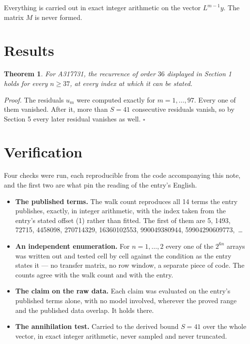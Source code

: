 \documentclass[11pt]{article}
\newtheorem{theorem}{Theorem}
\theoremstyle{definition}
\begin{document}
Everything is carried out in exact integer arithmetic on the vector $L^{m-1}y$. The matrix $M$ is never formed.

\section{Results}

\begin{theorem} For A317731, the recurrence of order $36$ displayed in Section 1 holds for every $n \ge 37$, at every index at which it can be stated.\end{theorem}

{\itshape Proof.} The residuals $u_m$ were computed exactly for $m = 1,\dots,97$. Every one of them vanished. After it, more than $S = 41$ consecutive residuals vanish, so by Section 5 every later residual vanishes as well. $\square$

\section{Verification}

Four checks were run, each reproducible from the code accompanying this note, and the first two are what pin the reading of the entry's English.

\begin{itemize}

\item {\bfseries The published terms.} The walk count reproduces all 14 terms the entry publishes, exactly, in integer arithmetic, with the index taken from the entry's stated offset (1) rather than fitted. The first of them are 5, 1493, 72715, 4458098, 270714329, 16360102553, 990049380944, 59904290609773,~\dots

\item {\bfseries An independent enumeration.} For $n = 1,\dots,2$ every one of the $2^{6n}$ arrays was written out and tested cell by cell against the condition as the entry states it --- no transfer matrix, no row window, a separate piece of code. The counts agree with the walk count and with the entry.

\item {\bfseries The claim on the raw data.} Each claim was evaluated on the entry's published terms alone, with no model involved, wherever the proved range and the published data overlap. It holds there.

\item {\bfseries The annihilation test.} Carried to the derived bound $S = 41$ over the whole vector, in exact integer arithmetic, never sampled and never truncated.

\end{itemize}
\end{document}
